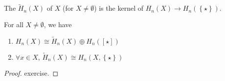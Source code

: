 \begin{definition}\label{def:reduced-homology}
    The  $\tilde{H}_n(X)$ of $X$ (for  $X\neq \emptyset$) is the kernel of $H_n(X) \to  H_n(\left \{\star\right\} )$. 
\end{definition}

\begin{lemma}\label{lm:reduced-homology-and-homology-relations-facts}
    For all $X\neq \emptyset$, we have
    \begin{enumerate}[1)]
        \item $H_n(X) \cong \tilde{H}_n(X) \oplus H_n(\left[ \star \right] )$
        \item $\forall x\in X$, $\tilde{H}_n(X)\cong H_n(X,\left \{\star\right\} )$
    \end{enumerate}
\end{lemma}

\begin{proof}
    exercise.
\end{proof}

